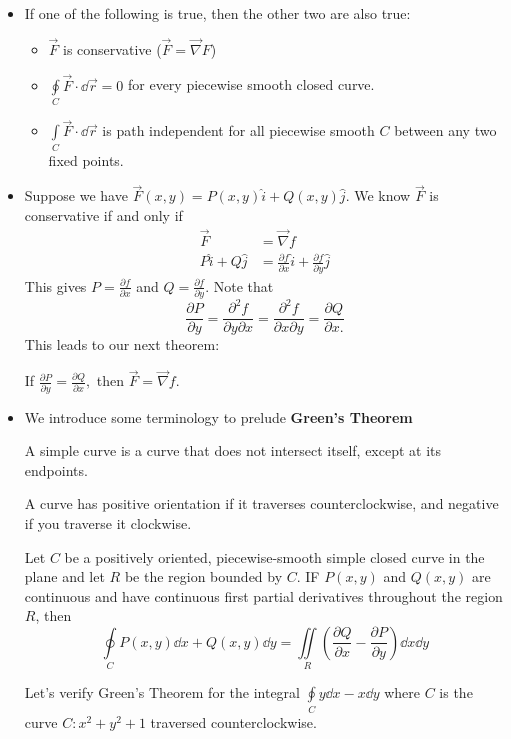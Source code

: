 \begin{itemize}
    \item If one of the following is true, then the other two are also true: 
    \begin{itemize}
        \item $\vec{F}$ is conservative ($\vec{F}=\vec{\nabla}F$)
        \item $\oint\limits_C \vec{F}\cdot \dd{\vec{r}} = 0$ for every piecewise smooth closed curve.
        \item $\int\limits_C \vec{F}\cdot \dd{\vec{r}}$ is path independent for all piecewise smooth $C$ between any two fixed points.
    \end{itemize}
    \item Suppose we have $\vec{F}(x,y)=P(x,y)\hat{i} + Q(x,y)\hat{j}.$ We know $\vec{F}$ is conservative if and only if 
    \begin{align}
        \vec{F} &= \vec{\nabla}f \\ 
        P\hat{i}+Q\hat{j} &= \frac{\partial f}{\partial x}\hat{i} + \frac{\partial f}{\partial y}\hat{j}
    \end{align}
    This gives $P=\frac{\partial f}{\partial x}$ and $Q =\frac{\partial f}{\partial y}$. Note that \begin{equation}
        \frac{\partial P}{\partial y}=\frac{\partial ^2 f}{\partial y\partial x}=\frac{\partial^2 f}{\partial x\partial y}=\frac{\partial Q}{\partial x.}
    \end{equation}
    This leads to our next theorem: 
    \begin{theorem}
        If $\frac{\partial P}{\partial y}=\frac{\partial Q}{\partial x},$ then $\vec{F}=\vec{\nabla} f$.
    \end{theorem}
    \item We introduce some terminology to prelude \textbf{Green's Theorem}
    \begin{definition}
        A simple curve is a curve that does not intersect itself, except at its endpoints. 
    \end{definition}
    \begin{definition}
        A curve has positive orientation if it traverses counterclockwise, and negative if you traverse it clockwise.
    \end{definition}
    \begin{definition}
        Let $C$ be a positively oriented, piecewise-smooth simple closed curve in the plane and let $R$ be the region bounded by $C$. IF $P(x,y)$ and $Q(x,y)$ are continuous and have continuous first partial derivatives throughout the region $R$, then 
        \begin{equation}
            \oint\limits_C P(x,y)\dd{x} + Q(x,y)\dd{y} = \iint\limits_R \left(\frac{\partial Q}{\partial x} - \frac{\partial P}{\partial y}\right) \dd{x}\dd{y}
        \end{equation}
    \end{definition}
    \begin{example}
        Let's verify Green's Theorem for the integral $\oint\limits_C y\dd{x}-x\dd{y}$ where $C$ is the curve $C:x^2+y^2+1$ traversed counterclockwise.
        \vspace{2mm}


\end{example}
\end{itemize}
